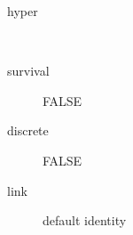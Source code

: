 \begin{description}
	\item[hyper]\ 
	 \item[ survival ] FALSE 
	 \item[ discrete ] FALSE 
	 \item[ link ] default identity 
\end{description}
